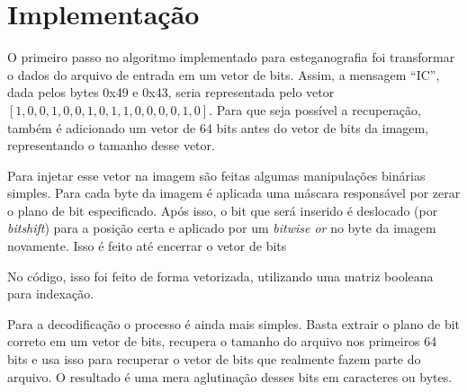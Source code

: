 \section{Implementação}

O primeiro passo no algoritmo  implementado para esteganografia foi transformar o dados do arquivo de entrada em um vetor de bits. Assim, a mensagem ``IC'', dada pelos bytes 0x49 e 0x43, seria representada pelo vetor $[1, 0, 0, 1, 0, 0, 1, 0, 1, 1, 0, 0, 0, 0, 1, 0]$. Para que seja possível a recuperação, também é adicionado um vetor de 64 bits antes do vetor de bits da imagem, representando o tamanho desse vetor.

Para injetar esse vetor na imagem são feitas algumas manipulações binárias simples. Para cada byte da imagem é aplicada uma máscara responsável por zerar o plano de bit especificado. Após isso, o bit que será inserido é deslocado (por \textit{bitshift}) para a posição certa e aplicado por um \textit{bitwise or} no byte da imagem novamente. Isso é feito até encerrar o vetor de bits

No código, isso foi feito de forma vetorizada, utilizando uma matriz booleana para indexação.

Para a decodificação o processo é ainda mais simples. Basta extrair o plano de bit correto em um vetor de bits, recupera o tamanho do arquivo nos primeiros 64 bits e usa isso para recuperar o vetor de bits que realmente fazem parte do arquivo. O resultado é uma mera aglutinação desses bits em caracteres ou bytes.
